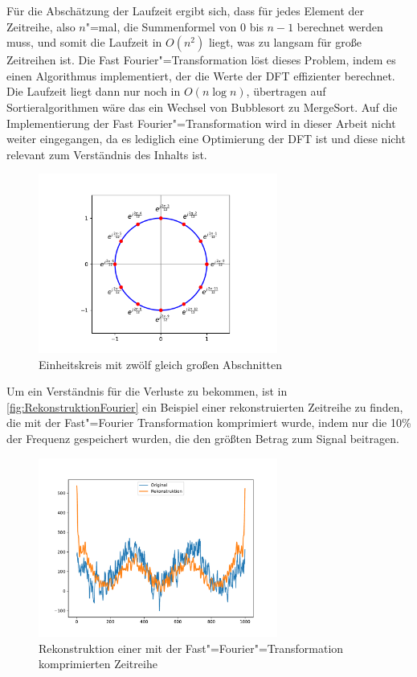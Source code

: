 Für die Abschätzung der Laufzeit ergibt sich, dass für jedes Element der Zeitreihe, also $n$"=mal, die Summenformel von 0 bis $n-1$ berechnet werden muss, und somit die Laufzeit in $O(n^2)$ liegt, was zu langsam für große Zeitreihen ist. Die Fast Fourier"=Transformation löst dieses Problem, indem es einen Algorithmus implementiert, der die Werte der \acs{DFT} effizienter berechnet. Die Laufzeit liegt dann nur noch in $O(n\log n)$, übertragen auf Sortieralgorithmen wäre das ein Wechsel von Bubblesort zu MergeSort. Auf die Implementierung der Fast Fourier"=Transformation wird in dieser Arbeit nicht weiter eingegangen, da es lediglich eine Optimierung der \acs{DFT} ist und diese nicht relevant zum Verständnis des Inhalts ist.
\begin{figure}[bth] 
  \centering
  \includegraphics[width=0.7\textwidth]{Graphics/KomplexerEinheitskreis.pdf}
  \caption{Einheitskreis mit zwölf gleich großen Abschnitten}
  \label{fig:komplexerEinheitskreis}
\end{figure}

Um ein Verständnis für die Verluste zu bekommen, ist in \autoref{fig:RekonstruktionFourier} ein Beispiel einer rekonstruierten Zeitreihe zu finden, die mit der Fast"=Fourier Transformation komprimiert wurde, indem nur die 10\% der Frequenz gespeichert wurden, die den größten Betrag zum Signal beitragen.
\begin{figure}[bth] 
  \centering
  \includegraphics[width=0.7\textwidth]{Graphics/RekonstruktionFourier.pdf}
  \caption{Rekonstruktion einer mit der Fast"=Fourier"=Transformation komprimierten Zeitreihe}
  \label{fig:RekonstruktionFourier}
\end{figure}

